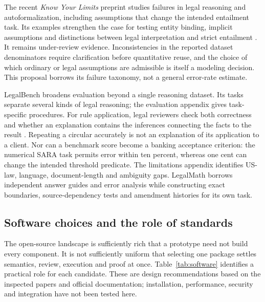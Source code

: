 The recent \emph{Know Your Limits} preprint studies failures in legal reasoning
and autoformalization, including assumptions that change the intended entailment
task. Its examples strengthen the case for testing entity binding, implicit
assumptions and distinctions between legal interpretation and strict entailment
\citep[secs.~3--5]{limits2026}. It remains under-review evidence. Inconsistencies
in the reported dataset denominators require clarification before quantitative
reuse, and the choice of which ordinary or legal assumptions are admissible is
itself a modeling decision. This proposal borrows its failure taxonomy, not a
general error-rate estimate.

LegalBench broadens evaluation beyond a single reasoning dataset. Its tasks
separate several kinds of legal reasoning; the evaluation appendix gives
task-specific procedures. For rule application, legal reviewers check both
correctness and whether an explanation contains the inferences connecting the
facts to the result \citep[sec.~3 and evaluation appendix]{legalbench2023}.
Repeating a circular accurately is not an explanation of its application to a
client. Nor can a benchmark score become a banking acceptance criterion: the
numerical SARA task permits error within ten percent, whereas one cent can change
the intended threshold predicate. The limitations appendix identifies US-law,
language, document-length and ambiguity gaps. LegalMath borrows independent
answer guides and error analysis while constructing exact boundaries,
source-dependency tests and amendment histories for its own task.

\subsection{Software choices and the role of standards}

The open-source landscape is sufficiently rich that a prototype need not build
every component. It is not sufficiently uniform that selecting one package
settles semantics, review, execution and proof at once. Table~\ref{tab:software}
identifies a practical role for each candidate. These are design recommendations
based on the inspected papers and official documentation; installation,
performance, security and integration have not been tested here.

